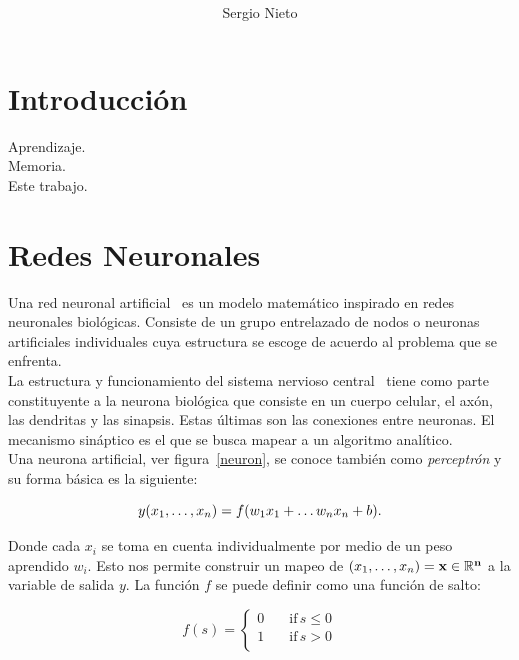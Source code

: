 \documentclass[letterpaper,12pt]{article}
\title{{\boldmath{ Memoria Densamente Asociada}}
           }
\author[1]{Sergio Nieto}
\affiliation{Facultad de Ciencias\note{Curso: Seminario de Matemáticas Aplicadas}, UNAM.}
\begin{document}
\maketitle
\flushbottom

\section{Introducción}
\label{sec:intro}


Aprendizaje.\\

\parindent=0cm Memoria.\\

Este trabajo. \\

\section{Redes Neuronales}
\label{sec:nn}

 Una red neuronal artificial~\cite{dl, rr} es un modelo matemático inspirado en redes neuronales biológicas. Consiste de un grupo entrelazado de nodos o neuronas artificiales individuales cuya estructura se escoge de acuerdo al problema que se enfrenta. \\

La estructura y funcionamiento del sistema nervioso central~\cite{neuro} tiene como parte constituyente a la neurona biológica que consiste en un cuerpo celular, el axón, las dendritas y las sinapsis. Estas últimas son las conexiones entre neuronas. El mecanismo sináptico es el que se busca mapear a un algoritmo analítico.\\

Una neurona artificial, ver figura~\ref{neuron}, se conoce también como \emph{perceptrón} y su forma básica es la siguiente:

\begin{equation}
  y(x_1, \dots, x_n) = f(w_1 x_1 + \dots w_n x_n + b). \\
\end{equation}

Donde cada $x_i$ se toma en cuenta individualmente por medio de un peso aprendido $w_i$. Esto nos permite construir un mapeo de $(x_1, \dots, x_n) = \bf{x} \in \mathbb{R}^n$ a la variable de salida $y$. La función $f$ se puede definir como una función de salto:

\begin{equation*}
f(s)=\begin{cases}
          0 \quad &\text{if} \, s \leq 0 \\
          1 \quad &\text{if} \, s > 0 \\
     \end{cases}
\end{equation*}
\end{document}
